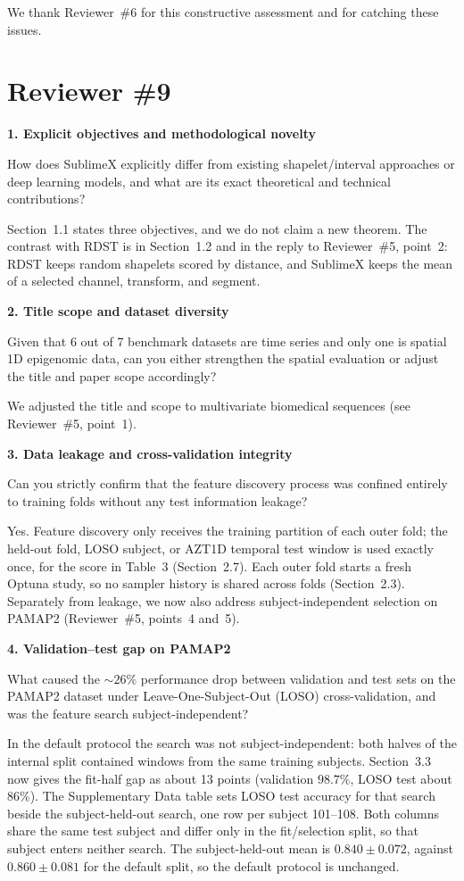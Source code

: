 \documentclass[11pt]{article}
\makeatletter
\newcommand{\rsp}{\par\vspace{0.9em}}
\newcommand{\rcitem}[2]{\begin{reviewerbox}\textbf{#1}\par\smallskip#2\end{reviewerbox}}
\newcommand{\response}[2]{%
  \begin{responsebox}#1%
  \def\@responseitems{#2}%
  \ifx\@responseitems\empty\else\begin{itemize}[nosep,leftmargin=1.2em]#2\end{itemize}\fi
  \end{responsebox}\rsp}
\makeatother
\begin{document}
\response{We thank Reviewer~\#6 for this constructive assessment and for catching these issues.}{}

\section*{Reviewer \#9}

\rcitem{1. Explicit objectives and methodological novelty}{How does SublimeX explicitly differ from
existing shapelet/interval approaches or deep learning models, and what are its exact theoretical and
technical contributions?}

\response{Section~1.1 states three objectives, and we do not claim a new theorem.
The contrast with RDST is in Section~1.2 and in the reply to Reviewer~\#5, point~2:
RDST keeps random shapelets scored by distance, and SublimeX keeps the mean of a selected
channel, transform, and segment.}{}

\rcitem{2. Title scope and dataset diversity}{Given that 6 out of 7 benchmark datasets are time series
and only one is spatial 1D epigenomic data, can you either strengthen the spatial evaluation or adjust
the title and paper scope accordingly?}

\response{We adjusted the title and scope to multivariate biomedical sequences (see Reviewer~\#5,
point~1).}{}

\rcitem{3. Data leakage and cross-validation integrity}{Can you strictly confirm that the feature
discovery process was confined entirely to training folds without any test information leakage?}

\response{Yes. Feature discovery only receives the training partition of each outer fold; the held-out
fold, LOSO subject, or AZT1D temporal test window is used exactly once, for the score in Table~3
(Section~2.7). Each outer fold starts a fresh Optuna study, so no sampler history is shared across
folds (Section~2.3). Separately from leakage, we now also address subject-independent selection on
PAMAP2 (Reviewer~\#5, points~4 and~5).}{}

\rcitem{4. Validation--test gap on PAMAP2}{What caused the ${\sim}26\%$ performance drop between
validation and test sets on the PAMAP2 dataset under Leave-One-Subject-Out (LOSO) cross-validation,
and was the feature search subject-independent?}

\response{In the default protocol the search was not subject-independent: both halves of the internal
split contained windows from the same training subjects. Section~3.3 now gives the fit-half gap as
about 13 points (validation $98.7\%$, LOSO test about $86\%$). The Supplementary Data table sets
LOSO test accuracy for that search beside the subject-held-out search, one row per subject 101--108.
Both columns share the same test subject and differ only in the fit/selection split, so that
subject enters neither search. The subject-held-out mean is $0.840\pm0.072$, against
$0.860\pm0.081$ for the default split, so the default protocol is unchanged.}{}
\end{document}
